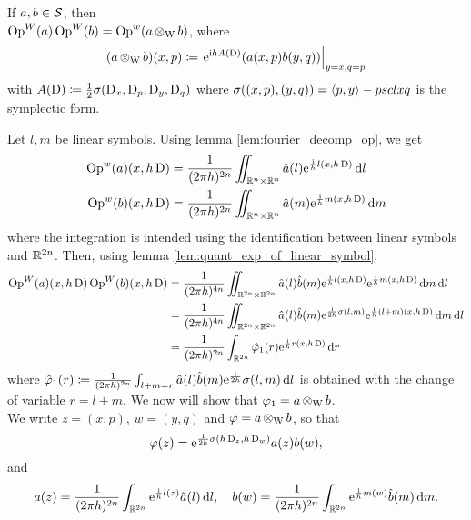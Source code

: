 \begin{nteo}
\label{teo:quant_compos_theorem}
If $a,b\in\mathcal{S}$, then\\ $\operatorname{Op}^{W}(a)\operatorname{Op}^{W}(b)=\operatorname{Op}^{w}(a\operatorname{\otimes_{W}} b)$, where
\[
(a\operatorname{\otimes_{W}} b)(x,p)\coloneqq \left.\mathrm{e}^{\mathrm{i}h A(\operatorname{D})}(a(x,p)b(y,q))\right|_{y=x,q=p}
\]
with $A(\operatorname{D})\coloneqq\frac{1}{2}\sigma(\operatorname{D}_{x},\operatorname{D}_{p},\operatorname{D}_{y},\operatorname{D}_{q})$ where $\sigma((x,p),(y,q))=\left< p,y\right>-pscl{x}{q}$ is the symplectic form. 
\end{nteo}
\begin{prf}

Let $l,m$ be linear symbols. Using lemma \ref{lem:fourier_decomp_op}, we get
\begin{align*}
\operatorname{Op}^{w}(a)(x,h\operatorname{D})&=\frac{1}{(2\pi h)^{2n}}\iint_{\mathbb{R}^{n}\times\mathbb{R}^{n}}\hat{a}(l)\mathrm{e}^{\frac{\mathrm{i}}{h}l(x,h\operatorname{D})}\mathop{}\!\mathrm{d} l\\
\operatorname{Op}^{w}(b)(x,h\operatorname{D})&=\frac{1}{(2\pi h)^{2n}}\iint_{\mathbb{R}^{n}\times\mathbb{R}^{n}}\hat{a}(m)\mathrm{e}^{\frac{\mathrm{i}}{h}m(x,h\operatorname{D})}\mathop{}\!\mathrm{d} m
\end{align*}
where the integration is intended using the identification between linear symbols and $\mathbb{R}^{2n}$. Then, using lemma \ref{lem:quant_exp_of_linear_symbol},
\begin{align*}
\operatorname{Op}^{W}(a)(x,h\operatorname{D})\operatorname{Op}^{W}(b)(x,h\operatorname{D})&=\frac{1}{(2\pi h)^{4n}}\iint_{\mathbb{R}^{2n}\times\mathbb{R}^{2n}}\hat{a}(l)\hat{b}(m)\mathrm{e}^{\frac{\mathrm{i}}{h}l(x,h\operatorname{D})}\mathrm{e}^{\frac{\mathrm{i}}{h}m(x,h\operatorname{D})}\mathop{}\!\mathrm{d} m\mathop{}\!\mathrm{d} l\\
&=\frac{1}{(2\pi h)^{4n}}\iint_{\mathbb{R}^{2n}\times\mathbb{R}^{2n}}\hat{a}(l)\hat{b}(m)\mathrm{e}^{\frac{\mathrm{i}}{2h}\sigma(l,m)}\mathrm{e}^{\frac{\mathrm{i}}{h}(l+m)(x,h\operatorname{D})}\mathop{}\!\mathrm{d} m\mathop{}\!\mathrm{d} l\\
&=\frac{1}{(2\pi h)^{2n}}\int_{\mathbb{R}^{2n}}\hat{\varphi}_{1}(r)\mathrm{e}^{\frac{\mathrm{i}}{h}r(x,h\operatorname{D})}\mathop{}\!\mathrm{d} r
\end{align*}
where $\hat{\varphi}_{1}(r)\coloneqq\frac{1}{(2\pi h)^{2n}}\int_{l+m=r}\hat{a}(l)\hat{b}(m)\mathrm{e}^{\frac{\mathrm{i}}{2h}}\sigma(l,m)\mathop{}\!\mathrm{d} l$ is obtained with the change of variable $r=l+m$. We now will show that $\varphi_{1}=a\operatorname{\otimes_{W}} b$.\\
We write $z=(x,p)$, $w=(y,q)$ and $\varphi=a\operatorname{\otimes_{W}} b$, so that 
\[
\varphi(z)=\mathrm{e}^{\frac{\mathrm{i}}{2h}\sigma(h\operatorname{D}_{z},h\operatorname{D}_{w})}a(z)b(w),
\] 
and 
\[
a(z)=\frac{1}{(2\pi h)^{2n}}\int_{\mathbb{R}^{2n}}\mathrm{e}^{\frac{\mathrm{i}}{h}l(z)}\hat{a}(l)\mathop{}\!\mathrm{d} l,\quad b(w)=\frac{1}{(2\pi h)^{2n}}\int_{\mathbb{R}^{2n}}\mathrm{e}^{\frac{\mathrm{i}}{h}m(w)}\hat{b}(m)\mathop{}\!\mathrm{d} m.
\]
\end{prf}
